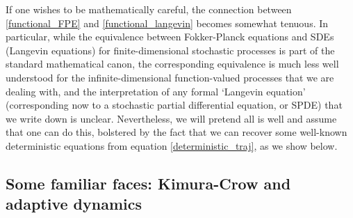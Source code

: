 If one wishes to be mathematically careful, the connection between \eqref{functional_FPE} and \eqref{functional_langevin} becomes somewhat tenuous. In particular, while the equivalence between Fokker-Planck equations and SDEs (Langevin equations) for finite-dimensional stochastic processes is part of the standard mathematical canon, the corresponding equivalence is much less well understood for the infinite-dimensional function-valued processes that we are dealing with, and the interpretation of any formal `Langevin equation' (corresponding now to a stochastic partial differential equation, or SPDE) that we write down is unclear. Nevertheless, we will pretend all is well and assume that one can do this, bolstered by the fact that we can recover some well-known deterministic equations from equation \eqref{deterministic_traj}, as we show below.

\subsection{Some familiar faces: Kimura-Crow and adaptive dynamics}


